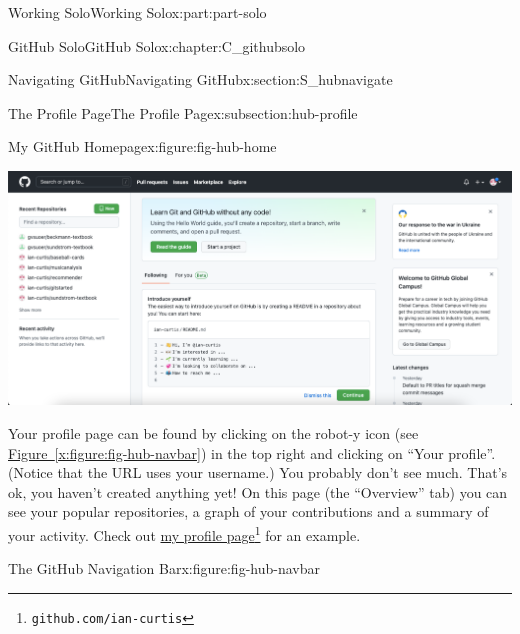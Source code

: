 \documentclass[oneside,10pt,]{book}
\newcommand{\xreffont}{\relax}
\begin{document}
\begin{partptx}{Working Solo}{}{Working Solo}{}{}{x:part:part-solo}
\begin{chapterptx}{GitHub Solo}{}{GitHub Solo}{}{}{x:chapter:C_githubsolo}
\begin{sectionptx}{Navigating GitHub}{}{Navigating GitHub}{}{}{x:section:S_hubnavigate}
\begin{subsectionptx}{The Profile Page}{}{The Profile Page}{}{}{x:subsection:hub-profile}
\begin{figureptx}{My GitHub Homepage}{x:figure:fig-hub-home}{}
\begin{image}{0.05}{0.9}{0.05}%
\includegraphics[width=\linewidth]{external/hub_home.pdf}
\end{image}%
\tcblower
\end{figureptx}%
Your profile page can be found by clicking on the robot-y icon (see \hyperref[x:figure:fig-hub-navbar]{Figure~{\xreffont\ref{x:figure:fig-hub-navbar}}}) in the top right and clicking on ``Your profile''. (Notice that the URL uses your username.) You probably don't see much. That's ok, you haven't created anything yet! On this page (the ``Overview'' tab) you can see your popular repositories, a graph of your contributions and a summary of your activity. Check out \href{https://github.com/ian-curtis}{my profile page}\footnote{\nolinkurl{github.com/ian-curtis}\label{g:fn:idp615696792}} for an example.%
\begin{figureptx}{The GitHub Navigation Bar}{x:figure:fig-hub-navbar}{}%
\begin{image}{0.35}{0.3}{0.35}%

\end{image}
\end{figureptx}
\end{subsectionptx}
\end{sectionptx}
\end{chapterptx}
\end{partptx}
\end{document}
